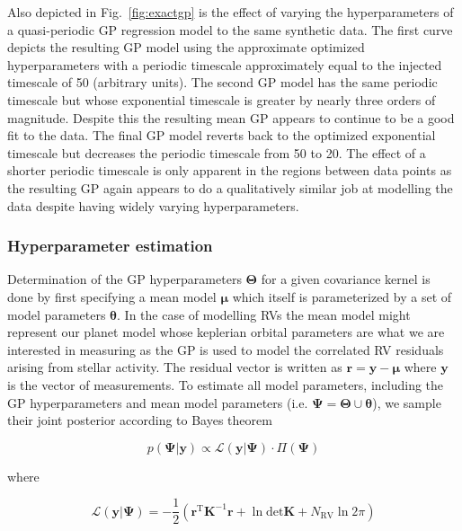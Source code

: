 Also depicted in Fig.~\ref{fig:exactgp} is the effect of varying the hyperparameters of
a quasi-periodic GP regression model to the same synthetic data. The first curve depicts
the resulting GP model using the approximate optimized hyperparameters with a periodic
timescale approximately equal to the injected timescale of 50 (arbitrary units). The second
GP model has the same periodic timescale but whose exponential timescale is greater by nearly
three orders of magnitude. Despite this the resulting mean GP appears to continue to be a good
fit to the data. The final GP model reverts back to the optimized exponential timescale but
decreases the periodic timescale from 50 to 20. The effect of a shorter periodic timescale
is only apparent in the regions between data points as the resulting GP again appears to do
a qualitatively similar job at modelling the data despite having widely varying hyperparameters.


\subsubsection{Hyperparameter estimation}
Determination of the GP hyperparameters $\boldsymbol{\Theta}$ for a given covariance kernel is
done by first specifying a mean model $\boldsymbol{\mu}$ which itself is parameterized by
a set of model parameters $\boldsymbol{\theta}$. In the case of modelling RVs the mean model
might represent our planet model whose keplerian orbital parameters are what we are interested
in measuring as the GP is used to model the correlated RV residuals arising from stellar
activity. The residual vector is written as $\mathbf{r} = \mathbf{y} - \boldsymbol{\mu}$
where $\mathbf{y}$ is the vector of \nrv{} measurements. 
To estimate all model parameters, including the GP hyperparameters and mean model
parameters (i.e. $\boldsymbol{\Psi} = \boldsymbol{\Theta} \cup \boldsymbol{\theta}$),
we sample their joint posterior according to Bayes theorem

\begin{equation}
  p(\boldsymbol{\Psi}|\mathbf{y}) \propto \mathcal{L}(\mathbf{y}|\boldsymbol{\Psi}) \cdot
  \Pi(\boldsymbol{\Psi})
  \label{eq:bayess}
\end{equation}

\noindent where

\begin{equation}
  \mathcal{L}(\mathbf{y}|\boldsymbol{\Psi}) =
  -\frac{1}{2} \left( \mathbf{r}^{\text{T}} \mathbf{K}^{-1} \mathbf{r} +
  \ln{\text{det}\mathbf{K}} + N_{\text{RV}} \ln{2\pi} \right)
  \label{eq:lnlikeGP}
\end{equation}

